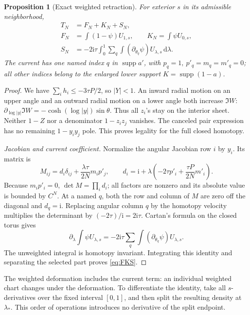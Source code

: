 \documentclass[11pt]{article}
\numberwithin{equation}{section}
\newtheorem{proposition}[theorem]{Proposition}
\theoremstyle{definition}
\newcommand{\dd}{\,\mathrm d}
\newcommand{\ii}{\mathrm i}
\begin{document}
\begin{proposition}[Exact weighted retraction]\label{prop:selector}
For exterior \(s\) in its admissible neighborhood,
\begin{align}
 T_N&=F_N+K_N+S_N,\label{eq:FKS}\\
 F_N&=\int(1-\psi)U_{1,s},\qquad K_N=\int\psi U_{0,s},\nonumber\\
 S_N&=-2\ii\tau\int_0^1\sum_q\int
                         (\partial_{\theta_q}\psi)U_{\lambda,s}\dd\lambda.
 \label{eq:current}
\end{align}
The current has one named index \(q\) in \(\operatorname{supp}a'\),
with \(p_q=1,\ p'_q=m_q=m'_q=0\); all other indices belong to
the enlarged lower support \(K=\operatorname{supp}(1-a)\).
\end{proposition}
\begin{proof}
We have \(\sum_i h_i\le-3\tau P/2\), so \(|Y|<1\).
An inward radial motion on an upper angle and an outward radial motion
on a lower angle both increase \(\Im W\):
\(\partial_{\log|y|}\Im W=-\cosh(\log|y|)\sin\theta\).
Thus all \(z_i\)'s stay on the interior sheet. Neither \(1-Z\)
nor a denominator \(1-z_iz_j\) vanishes. The canceled pair expression
has no remaining \(1-y_iy_j\) pole. This proves legality for the full
closed homotopy.

\smallskip\noindent\textit{Jacobian and current coefficient.}
Normalize the angular Jacobian row \(i\) by \(y_i\). Its matrix is
\[
 M_{ij}=d_i\delta_{ij}+\frac{\lambda\tau}{2N}m_i p'_j,\qquad
 d_i=\ii+\lambda\left(-2\tau p'_i+\frac{\tau P}{2N}m'_i\right).
\]
Because \(m_ip'_i=0\), \(\det M=\prod_i d_i\); all factors are
nonzero and its absolute value is bounded by \(C^N\).
At a named \(q\), both the row and column of \(M\) are zero
off the diagonal and \(d_q=\ii\). Replacing angular column \(q\)
by the homotopy velocity multiplies the determinant by
\((-2\tau)/\ii=2\ii\tau\).
Cartan's formula on the closed torus gives
\[
 \partial_\lambda\int\psi U_{\lambda,s}
 =-2\ii\tau\sum_q\int(\partial_{\theta_q}\psi)U_{\lambda,s}.
\]
The unweighted integral is homotopy invariant. Integrating this identity
and separating the selected part proves \eqref{eq:FKS}.
\end{proof}

The weighted deformation includes the current term: an individual
weighted chart changes under the deformation. To differentiate the
identity, take all \(s\)-derivatives over the fixed interval
\([0,1]\), and then split the resulting density at \(\lambda_*\).
This order of operations introduces no derivative of the split endpoint.
\end{document}
